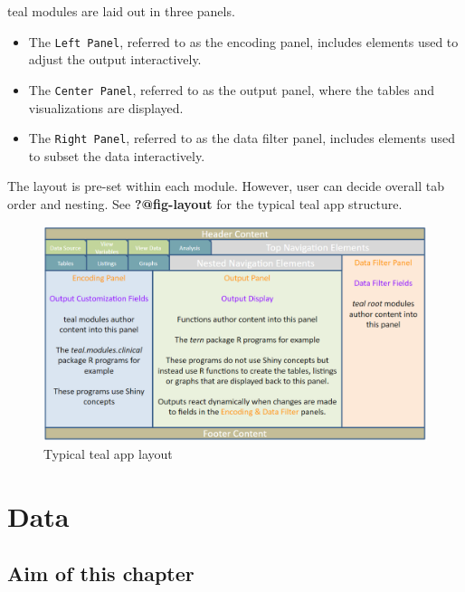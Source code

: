 \documentclass[
  letterpaper,
  DIV=11,
  numbers=noendperiod]{scrreprt}
\begin{document}
teal modules are laid out in three panels.

\begin{itemize}
\item
  The \texttt{Left\ Panel}, referred to as the encoding panel, includes
  elements used to adjust the output interactively.
\item
  The \texttt{Center\ Panel}, referred to as the output panel, where the
  tables and visualizations are displayed.
\item
  The \texttt{Right\ Panel}, referred to as the data filter panel,
  includes elements used to subset the data interactively.
\end{itemize}

The layout is pre-set within each module. However, user can decide
overall tab order and nesting. See \textbf{?@fig-layout} for the typical
teal app structure.

\begin{figure}

{\centering \includegraphics{./figures_images/teal_panel_layout.png}

}

\caption{Typical teal app layout}

\end{figure}


\hypertarget{data}{%
\chapter{Data}\label{data}}

\hypertarget{aim-of-this-chapter}{%
\section{Aim of this chapter}\label{aim-of-this-chapter}}
\end{document}
